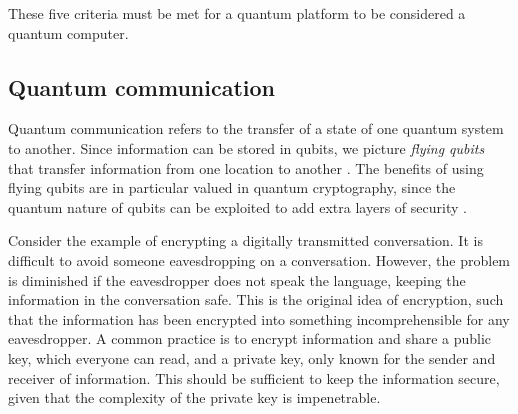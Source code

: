 \noindent These five criteria must be met for a quantum platform to be considered a quantum computer.




\subsection{Quantum communication}

Quantum communication refers to the transfer of a state of one quantum system to another. Since information can be stored in qubits, we picture \textit{flying qubits} that transfer information from one location to another \cite{Griffiths2002}. The benefits of using flying qubits are in particular valued in quantum cryptography, since the quantum nature of qubits can be exploited to add extra layers of security \cite{Pavicic2006}.



Consider the example of encrypting a digitally transmitted conversation. It is difficult to avoid someone eavesdropping on a conversation. However, the problem is diminished if the eavesdropper does not speak the language, keeping the information in the conversation safe. This is the original idea of encryption, such that the information has been encrypted into something incomprehensible for any eavesdropper. A common practice is to encrypt information and share a public key, which everyone can read, and a private key, only known for the sender and receiver of information. This should be sufficient to keep the information secure, given that the complexity of the private key is impenetrable.

